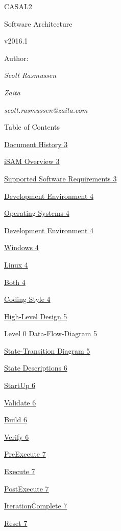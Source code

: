 \documentclass[a4paper,11pt,twoside,pdftex,draft]{article}
\date{}
\begin{document}
CASAL2

Software Architecture

v2016.1

Author:

\emph{Scott Rasmussen}

\emph{Zaita}

\emph{scott.rasmussen@zaita.com}

Table of Contents

\protect\hyperlink{document-history}{Document History 3}

\protect\hyperlink{casal2-overview}{iSAM Overview 3}

\protect\hyperlink{supported-operating-systems}{Supported Software
Requirements 3}

\protect\hyperlink{development-environment}{Development Environment 4}

\protect\hyperlink{operating-systems}{Operating Systems 4}

\protect\hyperlink{development-environment-1}{Development Environment 4}

\protect\hyperlink{windows}{Windows 4}

\protect\hyperlink{linux}{Linux 4}

\protect\hyperlink{both}{Both 4}

\protect\hyperlink{coding-style}{Coding Style 4}

\protect\hyperlink{high-level-design}{High-Level Design 5}

\protect\hyperlink{level-0-data-flow-diagram}{Level 0 Data-Flow-Diagram
5}

\protect\hyperlink{state-transition-diagram}{State-Transition Diagram 5}

\protect\hyperlink{state-descriptions}{State Descriptions 6}

\protect\hyperlink{startup}{StartUp 6}

\protect\hyperlink{validate}{Validate 6}

\protect\hyperlink{build}{Build 6}

\protect\hyperlink{verify}{Verify 6}

\protect\hyperlink{preexecute}{PreExecute 7}

\protect\hyperlink{execute}{Execute 7}

\protect\hyperlink{postexecute}{PostExecute 7}

\protect\hyperlink{iterationcomplete}{IterationComplete 7}

\protect\hyperlink{reset}{Reset 7}
\end{document}
